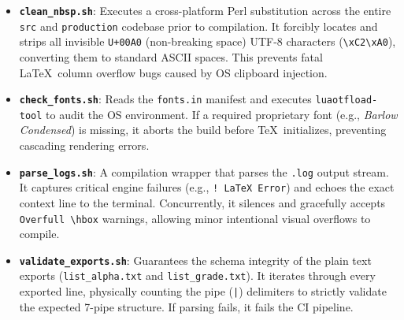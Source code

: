 \begin{itemize}
    \item \textbf{\texttt{clean\_nbsp.sh}}: Executes a cross-platform Perl substitution across the entire \texttt{src} and \texttt{production} codebase prior to compilation. It forcibly locates and strips all invisible \texttt{U+00A0} (non-breaking space) UTF-8 characters (\texttt{\textbackslash xC2\textbackslash xA0}), converting them to standard ASCII spaces. This prevents fatal \LaTeX\ column overflow bugs caused by OS clipboard injection.
    \item \textbf{\texttt{check\_fonts.sh}}: Reads the \texttt{fonts.in} manifest and executes \texttt{luaotfload-tool} to audit the OS environment. If a required proprietary font (e.g., \textit{Barlow Condensed}) is missing, it aborts the build before \TeX\ initializes, preventing cascading rendering errors.
    \item \textbf{\texttt{parse\_logs.sh}}: A compilation wrapper that parses the \texttt{.log} output stream. It captures critical engine failures (e.g., \texttt{! LaTeX Error}) and echoes the exact context line to the terminal. Concurrently, it silences and gracefully accepts \texttt{Overfull \textbackslash hbox} warnings, allowing minor intentional visual overflows to compile.
    \item \textbf{\texttt{validate\_exports.sh}}: Guarantees the schema integrity of the plain text exports (\texttt{list\_alpha.txt} and \texttt{list\_grade.txt}). It iterates through every exported line, physically counting the pipe (\texttt{|}) delimiters to strictly validate the expected 7-pipe structure. If parsing fails, it fails the CI pipeline.
\end{itemize}
